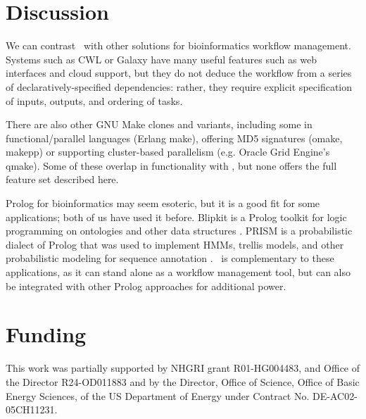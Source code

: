 \section*{Discussion}

We can contrast \biomake\ with other solutions for bioinformatics workflow management.
Systems such as CWL or Galaxy have many useful features such as web interfaces and cloud support,
but they do not deduce the workflow from a series of declaratively-specified dependencies: rather, they require explicit specification of inputs, outputs, and ordering of tasks.

There are also other GNU Make clones and variants, including some in functional/parallel languages (Erlang make),
offering MD5 signatures (omake, makepp)
or supporting cluster-based parallelism (e.g. Oracle Grid Engine's qmake).
Some of these overlap in functionality with \biomake, but none offers the full feature set described here.

Prolog for bioinformatics may seem esoteric, but it is a good fit for some applications; both of us have used it before.
Blipkit is a Prolog toolkit for logic programming on ontologies and other data structures \citep{Blipkit2009}.
PRISM is a probabilistic dialect of Prolog that was used to implement HMMs, trellis models, and other probabilistic modeling for sequence annotation \citep{MorkHolmes2012,HaveMork2014}.
\biomake\ is complementary to these applications, as it can stand alone as a workflow management tool, but can also be integrated with other Prolog approaches for additional power.

%

\section*{Funding}

This work was partially supported by NHGRI grant R01-HG004483, and Office of the Director R24-OD011883 and by the Director, Office of Science, Office of Basic Energy Sciences, of the US Department of Energy under Contract No. DE-AC02-05CH11231.


%
%
%
%
%
%
%
%



